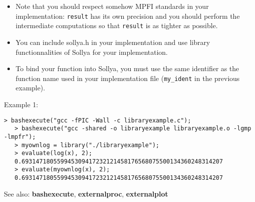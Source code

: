 \begin{itemize}
\item Note that you should respect somehow MPFI standards in your implementation:
   \verb|result| has its own precision and you should perform the 
   intermediate computations so that \verb|result| is as tighter as possible.

\item You can include sollya.h in your implementation and use library 
   functionnalities of Sollya for your implementation.

\item To bind your function into Sollya, you must use the same identifier as the
   function name used in your implementation file (\verb|my_ident| in the previous
   example).
\end{itemize}
\noindent Example 1: 
\begin{center}\begin{minipage}{14.8cm}\begin{Verbatim}[frame=single]
   > bashexecute("gcc -fPIC -Wall -c libraryexample.c");
   > bashexecute("gcc -shared -o libraryexample libraryexample.o -lgmp -lmpfr");
   > myownlog = library("./libraryexample");
   > evaluate(log(x), 2);
   0.693147180559945309417232121458176568075500134360248314207
   > evaluate(myownlog(x), 2);
   0.693147180559945309417232121458176568075500134360248314207
\end{Verbatim}
\end{minipage}\end{center}
See also: \textbf{bashexecute}, \textbf{externalproc}, \textbf{externalplot}
